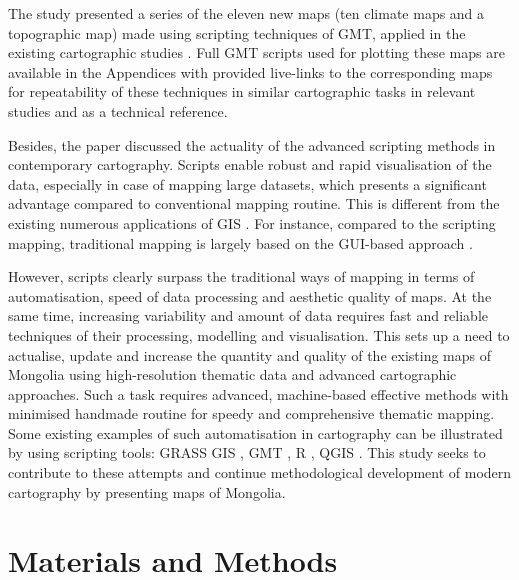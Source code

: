 \documentclass[geosciences,article,submit,pdftex,moreauthors]{Definitions/mdpi}
\begin{document}
The study presented a series of the eleven new maps (ten climate maps and a topographic map) made using scripting techniques of GMT, applied in the existing cartographic studies \cite{Lemenkova2019a,Kasalica,Lemenkova2021d,Spinellis,Lemenkova2021e,Virden}. Full GMT scripts used for plotting these maps are available in the Appendices with provided live-links to the corresponding maps for repeatability of these techniques in similar cartographic tasks in relevant studies and as a technical reference.

Besides, the paper discussed the actuality of the advanced scripting methods in contemporary cartography. Scripts enable robust and rapid visualisation of the data, especially in case of mapping large datasets, which presents a significant advantage compared to conventional mapping routine. This is different from the existing numerous applications of GIS \cite{FAN201696,TSUTSUMIDA2015196,Lemenkova2020c,Amarsaikhan,NAKAYAMA2021109404,Lemenkova2020d,PARK2019103630,OSULLIVAN2019101979}. For instance, compared to the scripting mapping, traditional mapping is largely based on the GUI-based approach \cite{Tuvshin,Lemenkova2020e,Lemenkova2021f,HOLGUIN2018137}. 

However, scripts clearly surpass the traditional ways of mapping in terms of automatisation, speed of data processing and aesthetic quality of maps. At the same time, increasing variability and amount of data requires fast and reliable techniques of their processing, modelling and visualisation. This sets up a need to actualise, update and increase the quantity and quality of the existing maps of Mongolia using high-resolution thematic data and advanced cartographic approaches. Such a task requires advanced, machine-based effective methods with minimised handmade routine for speedy and comprehensive thematic mapping. Some existing examples of such automatisation in cartography can be illustrated by using scripting tools: GRASS GIS \cite{FRIGERI20111265,Lemenkova2020f}, GMT \cite{5369602,Lemenkova2021g,BECKER20051075,Lemenkova2021h,OKUBO200459}, R \cite{Tserenpurev,Lemenkova2019b}, QGIS \cite{FANG202031,Lemenkova2020i}. This study seeks to contribute to these attempts and continue methodological development of modern cartography by presenting maps of Mongolia.

\section{Materials and Methods}
\end{document}
